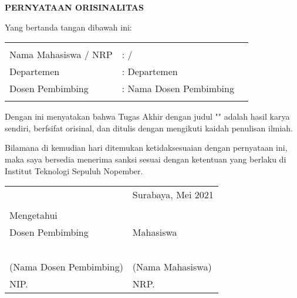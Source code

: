 \begin{center}
  \large
  \textbf{PERNYATAAN ORISINALITAS}
\end{center}

\thispagestyle{empty}

\vspace{2ex}


\noindent Yang bertanda tangan dibawah ini:

\noindent\begin{tabularx}{\textwidth}{X X l}
                       &                         \\
  Nama Mahasiswa / NRP & : \name{} / \nrp{}      \\
  Departemen           & : Departemen            \\
  Dosen Pembimbing     & : Nama Dosen Pembimbing \\
                       &                         \\
\end{tabularx}

Dengan ini menyatakan bahwa Tugas Akhir dengan judul "" adalah hasil karya sendiri, berfsifat orisinal, dan ditulis dengan mengikuti kaidah penulisan ilmiah.

Bilamana di kemudian hari ditemukan ketidaksesuaian dengan pernyataan ini, maka saya bersedia menerima sanksi sesuai dengan ketentuan yang berlaku di Institut Teknologi Sepuluh Nopember.

\vspace{8ex}

\noindent\begin{tabularx}{\textwidth}{X l}
                          & Surabaya, Mei 2021 \\
                          &                    \\
  Mengetahui              &                    \\
  Dosen Pembimbing        & Mahasiswa          \\
                          &                    \\
                          &                    \\
                          &                    \\
                          &                    \\
                          &                    \\
  (Nama Dosen Pembimbing) & (Nama Mahasiswa)   \\
  NIP.                    & NRP.               \\
\end{tabularx}
